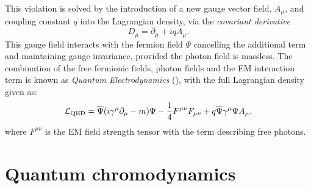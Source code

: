 This violation is solved by the introduction of a new gauge vector field, $A_{\mu}$, and coupling constant $q$ into the Lagrangian density, via the \textit{covariant derivative}
\begin{equation}
D_{\mu} = \partial_{\mu}+iqA_{\mu}.
\end{equation}
This gauge field interacts with the fermion field $\Psi$ cancelling the additional term and maintaining gauge invariance, provided the photon field is massless.
The combination of the free fermionic fields, photon fields and the EM interaction term is known as \textit{Quantum Electrodynamics} (\QED{}), with the full Lagrangian density given as:
\begin{equation}
\mathcal{L}_{\mathrm{QED}}=\overline{\Psi}(i\gamma^{\mu}\partial_{\mu}-m)\Psi - \frac{1}{4}F^{\mu \nu }F_{\mu \nu } + q\overline{\Psi}\gamma^{\mu}\Psi A_{\mu},
\end{equation}
where $F^{\mu \nu}$ is the EM field strength tensor with the term describing free photons.

\section{Quantum chromodynamics}
\label{sec:QCD}

